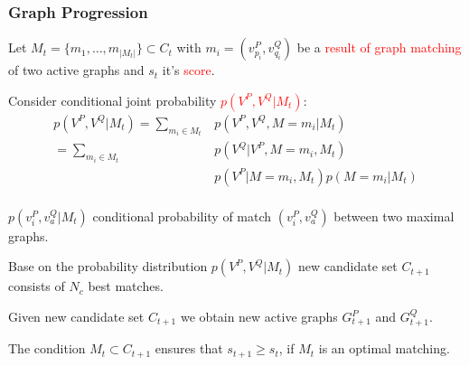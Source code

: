 \documentclass[hyperref={pdfpagelabels=false}]{beamer}
\begin{document}
\begin{frame} [allowframebreaks]
\frametitle{Graph Progression}
Let $M_t=\{m_1,\dots,m_{|M_t|}\}\subset C_t$ with $m_i=(v_{p_i}^P,v_{q_i}^Q)$ be a \textcolor{red}{result of graph matching} of two active graphs and $s_t$ it's \textcolor{red}{score}.

Consider conditional joint probability \textcolor{red}{$p(V^P,V^Q|M_t)$}:
\begin{align*}
	p(V^P,V^Q|M_t) = \sum_{m_i\in M_t}& p(V^P,V^Q,M=m_i|M_t) \\
				   = \sum_{m_i\in M_t}& p(V^Q|V^P,M=m_i,M_t)\\
				   & p(V^P|M=m_i, M_t) p(M=m_i|M_t)\\
\end{align*}

\framebreak

$p(v_i^P,v_a^Q|M_t)$	conditional probability of match $(v_i^P,v_a^Q)$ between two maximal graphs.

Base on the probability distribution $p(V^P,V^Q|M_t)$ new candidate set $C_{t+1}$ consists of $N_c$ best matches. 

Given new candidate set $C_{t+1}$ we obtain new active graphs $G_{t+1}^P$ and $G_{t+1}^Q$.

The condition $M_t\subset C_{t+1}$ ensures that $s_{t+1}\ge s_t$, if $M_t$ is an optimal matching. 

\end{frame}
\end{document}
